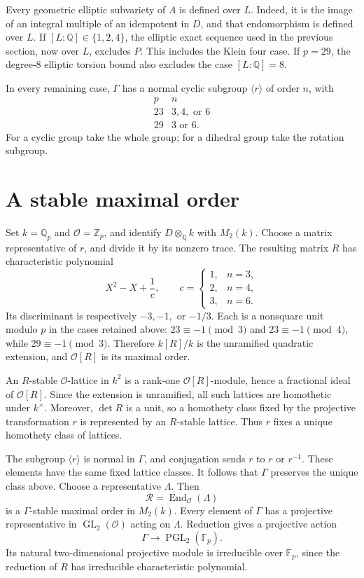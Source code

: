 \documentclass[11pt]{article}
\newcommand{\Q}{\mathbb Q}
\newcommand{\Z}{\mathbb Z}
\newcommand{\F}{\mathbb F}
\DeclareMathOperator{\End}{End}
\DeclareMathOperator{\GL}{GL}
\DeclareMathOperator{\PGL}{PGL}
\begin{document}
Every geometric elliptic subvariety of \(A\) is defined over \(L\).
Indeed, it is the image of an integral multiple of an idempotent in
\(D\), and that endomorphism is defined over \(L\). If
\([L:\Q]\in\{1,2,4\}\), the elliptic exact sequence used in the
previous section, now over \(L\), excludes \(P\). This includes the
Klein four case. If \(p=29\), the degree-\(8\) elliptic torsion bound
also excludes the case \([L:\Q]=8\).

In every remaining case, \(\Gamma\) has a normal cyclic subgroup
\(\langle r\rangle\) of order \(n\), with
\[
 \begin{array}{c|c}
 p & n\\ \hline
 23 & 3,4,\text{ or }6\\
 29 & 3\text{ or }6 .
 \end{array}
\]
For a cyclic group take the whole group; for a dihedral group take
the rotation subgroup.

\section{A stable maximal order}

Set \(k=\Q_p\) and \(\mathcal O=\Z_p\), and identify
\(D\otimes_{\Q}k\) with \(M_2(k)\).
Choose a matrix representative of \(r\), and divide it by its
nonzero trace. The resulting matrix \(R\) has characteristic
polynomial
\[
 X^2-X+\frac1c,\qquad
 c=
 \begin{cases}
 1,&n=3,\\
 2,&n=4,\\
 3,&n=6.
 \end{cases}
\]
Its discriminant is respectively \(-3,-1,\) or \(-1/3\).
Each is a nonsquare unit modulo \(p\) in the cases retained above:
\(23\equiv-1\pmod{3}\) and \(23\equiv-1\pmod{4}\), while
\(29\equiv-1\pmod{3}\). Therefore \(k[R]/k\) is the unramified
quadratic extension, and \(\mathcal O[R]\) is its maximal order.

An \(R\)-stable \(\mathcal O\)-lattice in \(k^2\) is a
rank-one \(\mathcal O[R]\)-module, hence a fractional ideal of
\(\mathcal O[R]\). Since the extension is unramified, all such
lattices are homothetic under \(k^\times\). Moreover, \(\det R\) is
a unit, so a homothety class fixed by the projective transformation
\(r\) is represented by an \(R\)-stable lattice. Thus \(r\) fixes a
unique homothety class of lattices.

The subgroup \(\langle r\rangle\) is normal in \(\Gamma\), and
conjugation sends \(r\) to \(r\) or \(r^{-1}\). These elements have
the same fixed lattice classes. It follows that \(\Gamma\)
preserves the unique class above. Choose a representative
\(\Lambda\). Then
\[
 \mathcal R=\End_{\mathcal O}(\Lambda)
\]
is a \(\Gamma\)-stable maximal order in \(M_2(k)\).
Every element of \(\Gamma\) has a projective representative in
\(\GL_2(\mathcal O)\) acting on \(\Lambda\). Reduction gives a
projective action
\[
 \Gamma\longrightarrow\PGL_2(\F_p).
\]
Its natural two-dimensional projective module is irreducible over
\(\F_p\), since the reduction of \(R\) has irreducible
characteristic polynomial.
\end{document}

